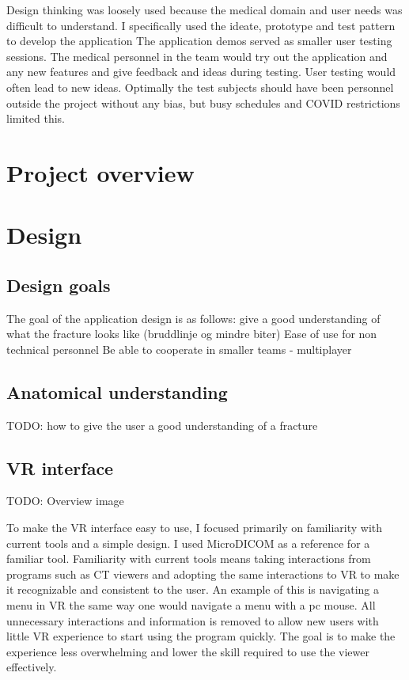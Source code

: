 \documentclass[a4paper]{report}
\begin{document}
Design thinking was loosely used because the medical domain and user needs was difficult to understand. I specifically used the ideate, prototype and test pattern to develop the application
The application demos served as smaller user testing sessions. The medical personnel in the team would try out the application and any new features and give feedback and ideas during testing. User testing would often lead to new ideas. Optimally the test subjects should have been personnel outside the project without any bias, but busy schedules and COVID restrictions limited this.

\section{Project overview}\label{CodeStructure}

\section{Design}

\subsection{Design goals}

The goal of the application design is as follows:
give a good understanding of what the fracture looks like (bruddlinje og mindre biter)
Ease of use for non technical personnel
Be able to cooperate in smaller teams - multiplayer

\subsection{Anatomical understanding}
TODO: how to give the user a good understanding of a fracture

\subsection{VR interface}

TODO: Overview image

To make the VR interface easy to use, I focused primarily on familiarity with current tools and a simple design.
I used MicroDICOM\cite{MicroDICOM} as a reference for a familiar tool.
Familiarity with current tools means taking interactions from programs such as CT viewers and adopting the same interactions to VR to make it recognizable and consistent to the user. An example of this is navigating a menu in VR the same way one would navigate a menu with a pc mouse.
 All unnecessary interactions and information is removed to allow new users with little VR experience to start using the program quickly. The goal is to make the experience less overwhelming and lower the skill required to use the viewer effectively.
\end{document}
